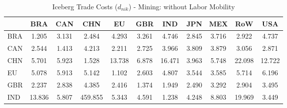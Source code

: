 \begin{table}[htbp]
\centering
\caption{Iceberg Trade Costs ($d_{nik}$) - Mining: without Labor Mobility} 
\label{tab:iceberg_Mining}
\begin{tabular}{lcccccccccc}
  \hline
 & BRA & CAN & CHN & EU & GBR & IND & JPN & MEX & RoW & USA \\ 
  \hline
BRA & \textcolor[RGB]{245,158,10}{1.205} & \textcolor[RGB]{133,86,122}{3.131} & \textcolor[RGB]{186,120,69}{2.484} & \textcolor[RGB]{71,46,184}{4.293} & \textcolor[RGB]{120,78,135}{3.261} & \textcolor[RGB]{59,38,196}{4.746} & \textcolor[RGB]{163,106,92}{2.845} & \textcolor[RGB]{94,61,161}{3.716} & \textcolor[RGB]{153,99,102}{2.922} & \textcolor[RGB]{61,40,194}{4.737} \\ 
  CAN & \textcolor[RGB]{176,114,79}{2.544} & \textcolor[RGB]{224,145,31}{1.413} & \textcolor[RGB]{77,50,178}{4.213} & \textcolor[RGB]{201,130,54}{2.211} & \textcolor[RGB]{171,111,84}{2.725} & \textcolor[RGB]{79,51,176}{3.966} & \textcolor[RGB]{92,59,163}{3.809} & \textcolor[RGB]{89,58,166}{3.879} & \textcolor[RGB]{143,92,112}{3.056} & \textcolor[RGB]{158,102,97}{2.871} \\ 
  CHN & \textcolor[RGB]{43,28,212}{5.701} & \textcolor[RGB]{31,20,224}{5.923} & \textcolor[RGB]{219,142,36}{1.528} & \textcolor[RGB]{13,8,242}{13.738} & \textcolor[RGB]{20,13,235}{6.878} & \textcolor[RGB]{8,5,247}{16.471} & \textcolor[RGB]{82,53,173}{3.963} & \textcolor[RGB]{38,25,217}{5.748} & \textcolor[RGB]{3,2,252}{22.098} & \textcolor[RGB]{15,10,240}{12.722} \\ 
  EU & \textcolor[RGB]{54,35,201}{5.078} & \textcolor[RGB]{33,21,222}{5.913} & \textcolor[RGB]{48,31,207}{5.142} & \textcolor[RGB]{247,160,8}{1.102} & \textcolor[RGB]{173,112,82}{2.603} & \textcolor[RGB]{56,36,199}{4.807} & \textcolor[RGB]{102,66,153}{3.544} & \textcolor[RGB]{99,64,156}{3.585} & \textcolor[RGB]{41,26,214}{5.714} & \textcolor[RGB]{25,16,230}{6.196} \\ 
  GBR & \textcolor[RGB]{199,129,56}{2.237} & \textcolor[RGB]{166,107,89}{2.838} & \textcolor[RGB]{66,43,189}{4.385} & \textcolor[RGB]{189,122,66}{2.416} & \textcolor[RGB]{230,148,26}{1.374} & \textcolor[RGB]{207,134,48}{1.949} & \textcolor[RGB]{181,117,74}{2.490} & \textcolor[RGB]{117,76,138}{3.292} & \textcolor[RGB]{156,101,99}{2.904} & \textcolor[RGB]{105,68,150}{3.495} \\ 
  IND & \textcolor[RGB]{10,7,245}{13.836} & \textcolor[RGB]{36,23,219}{5.807} & \textcolor[RGB]{0,0,255}{459.855} & \textcolor[RGB]{46,30,209}{5.343} & \textcolor[RGB]{64,41,191}{4.591} & \textcolor[RGB]{242,157,13}{1.238} & \textcolor[RGB]{74,48,181}{4.248} & \textcolor[RGB]{18,12,237}{8.803} & \textcolor[RGB]{5,3,250}{19.969} & \textcolor[RGB]{107,69,148}{3.449} \\ 

\end{tabular}
\end{table}
